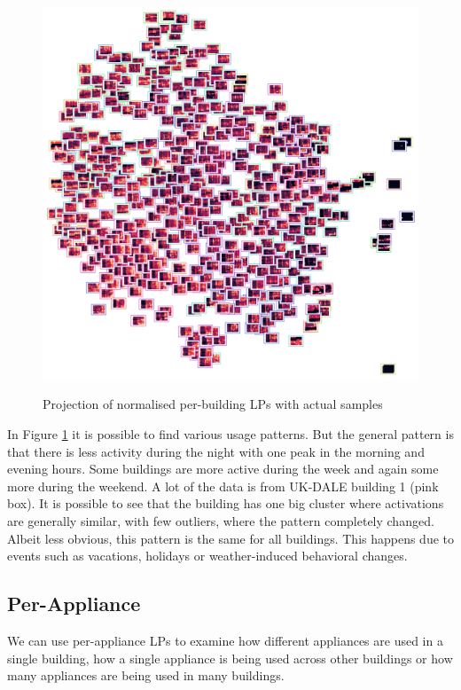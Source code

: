 \begin{figure}[H]
	\centering
	\caption{Projection of normalised per-building LPs with actual samples}
	\includegraphics[width=.9\textwidth]{Figures/TSNE/TSNE_per_building/img_scatter_per_building_norm.png}
	\label{fig:tsne_pb_img_norm_scatter_allall}
\end{figure}

In Figure \ref{fig:tsne_pb_img_norm_scatter_allall} it is possible to find various usage patterns. 
But the general pattern is that there is less activity during the night with one peak in the morning and evening hours.
Some buildings are more active during the week and again some more during the weekend.
A lot of the data is from UK-DALE building 1 (pink box). 
It is possible to see that the building has one big cluster where activations are generally similar, with few outliers, where the pattern completely changed. 
Albeit less obvious, this pattern is the same for all buildings.
This happens due to events such as vacations, holidays or weather-induced behavioral changes.

\subsection{Per-Appliance}

We can use per-appliance LPs to examine how different appliances 
are used in a single building, how a single appliance is being used across other buildings
or how many appliances are being used in many buildings.

